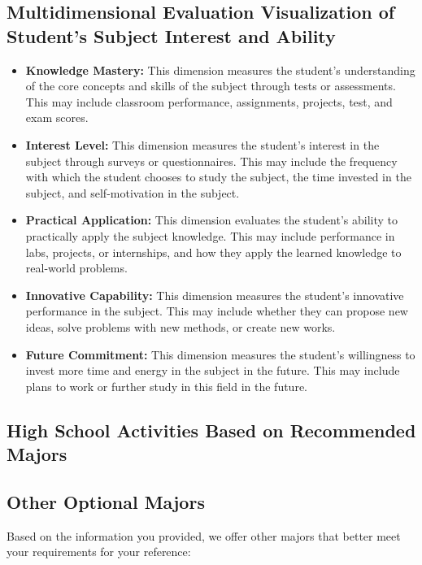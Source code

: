 \documentclass[12pt]{article}
\begin{document}
\begin{CJK*}{UTF8}{gbsn}
\subsection*{Multidimensional Evaluation Visualization of Student's Subject Interest and Ability}
\begin{itemize}
    \item \textbf{Knowledge Mastery:} This dimension measures the student's understanding of the core concepts and skills of the subject through tests or assessments. This may include classroom performance, assignments, projects, test, and exam scores.
    \item \textbf{Interest Level:} This dimension measures the student's interest in the subject through surveys or questionnaires. This may include the frequency with which the student chooses to study the subject, the time invested in the subject, and self-motivation in the subject.
    \item \textbf{Practical Application:} This dimension evaluates the student's ability to practically apply the subject knowledge. This may include performance in labs, projects, or internships, and how they apply the learned knowledge to real-world problems.
    \item \textbf{Innovative Capability:} This dimension measures the student's innovative performance in the subject. This may include whether they can propose new ideas, solve problems with new methods, or create new works.
    \item \textbf{Future Commitment:} This dimension measures the student's willingness to invest more time and energy in the subject in the future. This may include plans to work or further study in this field in the future.
\end{itemize}

\newpage
\hspace{0pt}
\vspace{0cm}
\subsection*{High School Activities Based on Recommended Majors}

\newpage
\hspace{0pt}
\vspace{0cm}
\subsection*{Other Optional Majors}
Based on the information you provided, we offer other majors that better meet your requirements for your reference:


\end{CJK*}
\end{document}
